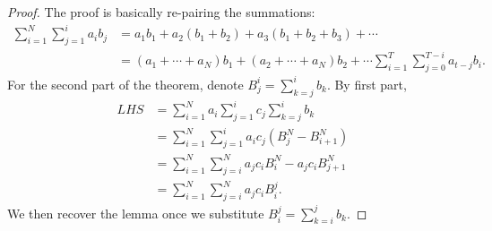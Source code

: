 


\begin{proof}
The proof is basically re-pairing the summations:
\begin{align*}
    \sum_{i=1}^N\sum_{j=1}^i a_i b_j 
    &= a_1b_1 + a_2(b_1+b_2) + a_3(b_1+b_2+b_3) + \dotsm \\
    &= (a_1+\dotsm+a_N)b_1 + (a_2+\dotsm+a_N)b_2 + \dotsm \sum_{i=1}^T\sum_{j=0}^{T-i} a_{t-j} b_i.
\end{align*}
For the second part of the theorem, denote $B_j^i=\sum_{k=j}^i b_k$. By first part,
\begin{align*}
    LHS &= \sum_{i=1}^N a_i \sum_{j=1}^i c_j \sum_{k=j}^i b_k \\
    &= \sum_{i=1}^N\sum_{j=1}^i a_ic_j (B_j^N-B_{i+1}^N) \\
    &= \sum_{i=1}^N\sum_{j=i}^N a_jc_iB_i^N - a_jc_iB_{j+1}^N \\
    &= \sum_{i=1}^N\sum_{j=i}^Na_jc_iB_i^j.
\end{align*}
We then recover the lemma once we substitute $B_i^j=\sum_{k=i}^j b_k$.
\end{proof}

